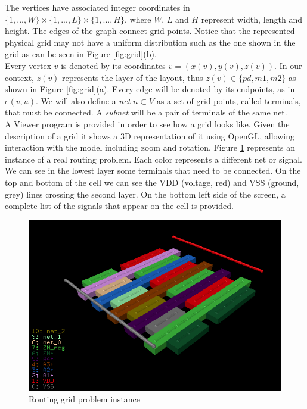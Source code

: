 The vertices have associated integer coordinates in $\{1, ..., W\} \times \{1, ..., L\} \times \{1, ..., H\}$, where $W$, $L$ and $H$ represent width, length and height. The edges of the graph connect grid points. Notice that the represented physical grid may not have a uniform distribution such as the one shown in the grid as can be seen in Figure \ref{fig:grid}(b). \\

Every vertex $v$ is denoted by its coordinates $v=(x(v),y(v),z(v))$. In our context, $z(v)$ represents the layer of the layout, thus $z(v) \in \{pd, m1, m2\}$ as shown in Figure  \ref{fig:grid}(a). Every edge will be denoted by its endpoints, as in $e(v, u)$. We will also define a \textit{net} $n \subset V$ as a set of grid points, called terminals, that must be connected. A \textit{subnet} will be a pair of terminals of the same net. \\

A Viewer program is provided in order to see how a grid looks like. Given the description of a grid it shows a 3D representation of it using OpenGL, allowing interaction with the model including zoom and rotation. Figure \ref{fig:ANDa} represents an instance of a real routing problem. Each color represents a different net or signal. We can see in the lowest layer some terminals that need to be connected. On the top and bottom of the cell we can see the VDD (voltage, red) and VSS (ground, grey) lines crossing the second layer. On the bottom left side of the screen, a complete list of the signals that appear on the cell is provided.  


\begin{figure}[h!]
  \centering
  \includegraphics[scale=0.6]{img/bckgrnd/ANDa.png}
  \caption{Routing grid problem instance}
  \label{fig:ANDa}
\end{figure}


